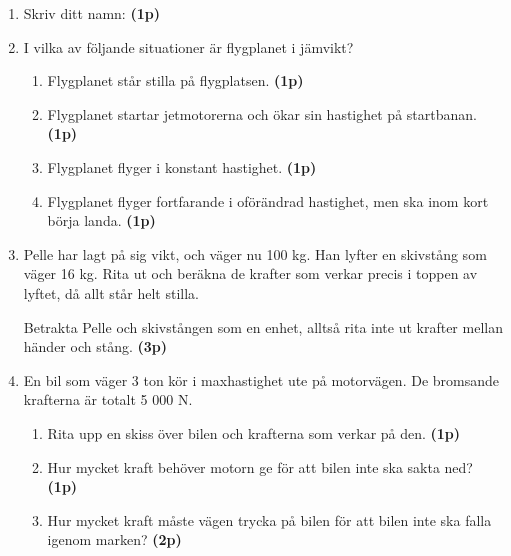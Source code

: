 \documentclass[11pt]{article}
\begin{document}
\begin{enumerate}[itemsep=0.5em]
      \item
            Skriv ditt namn: \underline{\hspace{5cm}} \textbf{(1p)}

      \item
            I vilka av följande situationer är flygplanet i jämvikt?
            \begin{enumerate}[label=\alph*)]
                  \item
                        Flygplanet står stilla på flygplatsen.
                        \textbf{(1p)}
                  \item
                        Flygplanet startar jetmotorerna och ökar sin
                        hastighet på startbanan. \textbf{(1p)}
                  \item
                        Flygplanet flyger i konstant hastighet.
                        \textbf{(1p)}
                  \item
                        Flygplanet flyger fortfarande i oförändrad
                        hastighet, men ska inom kort börja landa.
                        \textbf{(1p)}

            \end{enumerate}

      \item
            \begin{minipage}[t]{0.6\textwidth}
                  Pelle har lagt på sig vikt, och väger nu 100 kg. Han
                  lyfter en skivstång som väger 16 kg. Rita ut och beräkna
                  de
                  krafter som verkar precis i toppen av lyftet, då allt
                  står
                  helt stilla.

                  Betrakta Pelle och skivstången som en enhet, alltså rita
                  inte ut krafter mellan händer och stång. \textbf{(3p)}
            \end{minipage}
            \hspace{2em}
            \begin{adjustbox}{valign=t}
                  
            \end{adjustbox}
      \item
            En bil som väger 3 ton kör i maxhastighet ute på motorvägen. De
            bromsande
            krafterna är totalt 5 000 N.
            \begin{enumerate}[label=\alph*)]
                  \item
                        Rita upp en skiss över bilen och krafterna som
                        verkar på den. \textbf{(1p)}
                  \item
                        Hur mycket kraft behöver motorn ge för att bilen
                        inte ska sakta ned? \textbf{(1p)}
                  \item
                        Hur mycket kraft måste vägen trycka på bilen för
                        att bilen inte ska falla igenom marken?
                        \textbf{(2p)}
            \end{enumerate}


\end{enumerate}
\end{document}

